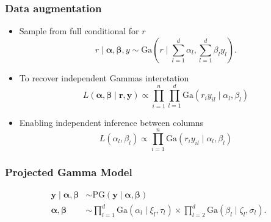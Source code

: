 \documentclass[aspectratio=169]{beamer}
\begin{document}
\begin{frame}
  \frametitle{Data augmentation}
  \begin{itemize}
    \item Sample from full conditional for $r$
      \begin{equation*}
        r\mid\bm{ \alpha},\bm{ \beta}, y \sim \text{Ga}\left(r\mid{\textstyle\sum}_{l = 1}^d \alpha_l,
              {\textstyle\sum}_{l = 1}^d \beta_ly_l\right).
      \end{equation*}
    \pause
    \item To recover independent Gammas interetation
      \begin{equation*}
        L(\bm{\alpha},\bm{\beta} \mid \bm{r},\bm{y}) \propto
            \prod_{i = 1}^n\prod_{l = 1}^{d}\text{Ga}\left(r_iy_{il}\mid\alpha_l,\beta_l\right)
      \end{equation*}
    \pause
    \item Enabling independent inference between columns
      \begin{equation*}
        L(\alpha_l,\beta_l) \propto \prod_{i = 1}^n
                  \text{Ga}\left(r_iy_{il}\mid\alpha_l,\beta_l\right)
      \end{equation*}
  \end{itemize}
\end{frame} %
\begin{frame}
  \frametitle{Projected Gamma Model}
  \begin{equation*}
    \begin{aligned}
      \bm{ y}\mid\bm{\alpha},\bm{\beta} &\sim \text{PG}(\bm{ y}\mid\bm{\alpha},\bm{\beta})\\
      \bm{ \alpha},\bm{\beta} &\sim {\textstyle \prod}_{l = 1}^d \text{Ga}(\alpha_l \mid \xi_l,\tau_l)
              \times {\textstyle \prod}_{l = 2}^d \text{Ga}(\beta_l\mid \zeta_l,\sigma_l).
    \end{aligned}
  \end{equation*}
\end{frame} %
\end{document}
